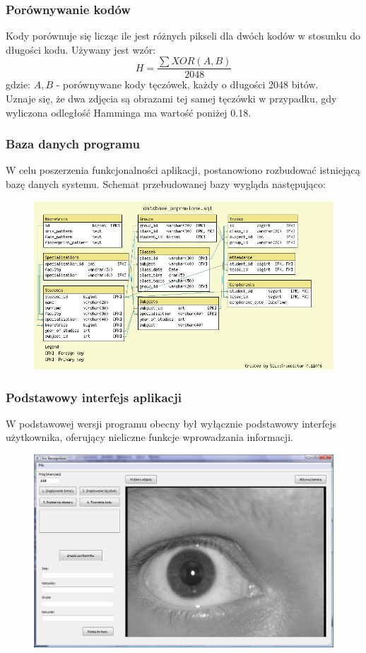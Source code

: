 \documentclass{beamer}
\begin{document}

\begin{frame}
\frametitle{Porównywanie kodów}
Kody porównuje się licząc ile jest różnych pikseli dla dwóch kodów w stosunku do długości kodu. Używany jest wzór:
$$ H = \frac{\sum XOR(A,B)}{2048} $$
gdzie:
$A, B$ - porównywane kody tęczówek, każdy o długości 2048 bitów.\\

Uznaje się, że dwa zdjęcia są obrazami tej samej tęczówki w przypadku, gdy wyliczona odległość Hamminga ma wartość poniżej 0.18.
\end{frame}

\begin{frame}
\frametitle{Baza danych programu}
W celu poszerzenia funkcjonalności aplikacji, postanowiono rozbudować istniejącą bazę danych systemu. Schemat przebudowanej bazy wygląda następująco:

\begin{figure}
\includegraphics[scale=0.3]{diagram.png}
\end{figure}
\end{frame}

\begin{frame}
\frametitle{Podstawowy interfejs aplikacji}
W podstawowej wersji programu obecny był wyłącznie podstawowy interfejs użytkownika, oferujący nieliczne funkcje wprowadzania informacji.
\begin{figure}
\includegraphics[scale=0.2]{oknoGlowne.jpg}
\end{figure}
\end{frame}
\end{document}
